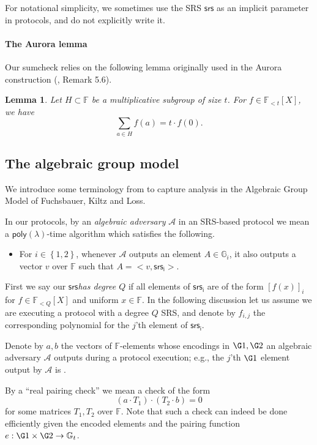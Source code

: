 \documentclass[11pt]{article} %
\newcommand{\Gi}{\ensuremath{{\mathbb G}_i}\xspace}
\newcommand{\Gt}{\ensuremath{{\mathbb G}_t}\xspace}
\newcommand{\F}{\ensuremath{\mathbb F}\xspace}
\newcommand{\adv}{\ensuremath{\mathcal A}\xspace}
\newcommand{\srs}{\ensuremath{\mathsf{srs}}\xspace}
\newcommand{\srsi}{\ensuremath{\mathsf{srs_i}}\xspace}
\newcommand{\enci}[1]{\ensuremath{\left[#1\right]_i}\xspace}
\newcommand{\set}[1]{\ensuremath{\left\{#1\right\}}\xspace}
\newcommand{\polysofdeg}[1]{\ensuremath{\F_{< #1}[X]}\xspace}
\newtheorem{lemma}{Lemma}[section]
\newcommand{\poly}{\ensuremath{\mathsf{poly(\lambda)}}\xspace}
\begin{document}
For notational simplicity, we sometimes use the SRS \srs as an implicit parameter in protocols, and do not explicitly write it.


\paragraph{The Aurora lemma}
Our sumcheck relies on the following lemma originally used in the Aurora construction (\cite{aurora}, Remark 5.6).
\begin{lemma}\label{lem:aurora}
 Let $H\subset \F$ be a multiplicative subgroup of size $t$.
 For $f\in\polysofdeg{t}$, we have 
\[\sum_{a\in H}f(a) = t\cdot f(0).\]
\end{lemma}



\subsection{The algebraic group model}\label{subsec:agm}
We introduce some terminology from \cite{plonk} to capture analysis in the Algebraic Group Model of Fuchsbauer, Kiltz and Loss\cite{AGM}.

In our protocols, by an \emph{algebraic adversary} \adv in an SRS-based protocol we mean a \poly-time algorithm which satisfies the following.
\begin{itemize}
 \item For $i\in \set{1,2}$, whenever \adv outputs an element $A\in \Gi$, it also outputs a vector $v$ over \F such that $A = <v,\srsi>$.
\end{itemize}

First we say our \srs \emph{has degree $Q$} if all elements of \srsi are of the form  \enci{f(x)} for $f\in \polysofdeg{Q}$ and uniform $x\in \F$. In the following discussion let us assume we are executing a protocol with a degree $Q$ SRS, and denote by $f_{i,j}$ the corresponding polynomial for the $j$'th element of \srsi.

Denote by $a,b$ the vectors of $\F$-elements whose encodings in $\G1,\G2$ an algebraic adversary \adv outputs during a protocol execution; e.g., the $j$'th $\G1$ element output by \adv is .

By a ``real pairing check'' we mean a check of the form
\[(a\cdot T_1) \cdot (T_2\cdot b)=0\]
for some matrices $T_1,T_2$ over $\F$.
Note that such a check can indeed be done efficiently given the encoded elements and the pairing function $e:\G1\times \G2\to \Gt$.
\end{document}
